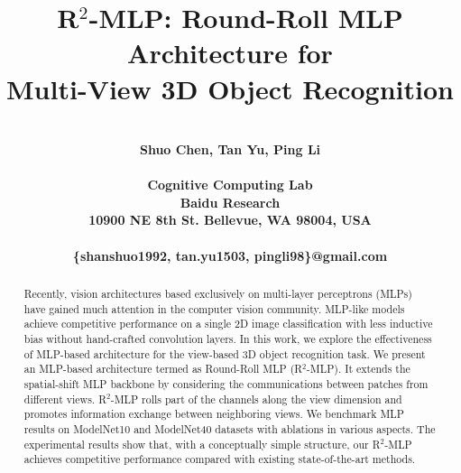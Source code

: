 \documentclass[11pt]{article}
\begin{document}
\title{\bf R$^2$-MLP: Round-Roll MLP Architecture for\\ Multi-View 3D Object Recognition}

\author{\vspace{0.5in}\\\bf Shuo Chen, Tan Yu, Ping Li\\\\
Cognitive Computing Lab\\
Baidu Research \\
10900 NE 8th St. Bellevue, WA 98004, USA\\\\
\{shanshuo1992, tan.yu1503, pingli98\}@gmail.com
}

\date{}
\maketitle

\begin{abstract}\vspace{0.3in}

\noindent Recently, vision architectures based exclusively on multi-layer perceptrons (MLPs) have gained much attention in the computer vision community. MLP-like models achieve competitive performance on a single 2D image classification with less inductive bias without hand-crafted convolution layers. In this work, we explore the effectiveness of MLP-based architecture for the view-based 3D object recognition task. We present an MLP-based architecture termed as Round-Roll MLP (R$^2$-MLP). It extends the spatial-shift MLP backbone by considering the communications between patches from different views. R$^2$-MLP rolls part of the channels along the view dimension and promotes information exchange between neighboring views. We benchmark MLP results on ModelNet10 and ModelNet40 datasets with ablations in various aspects. The experimental results show that, with a conceptually simple structure, our R$^2$-MLP achieves competitive performance compared with existing state-of-the-art methods.\vspace{-0.1in}
\end{abstract}


\newpage
\end{document}

